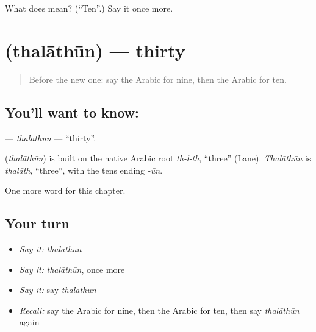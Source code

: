 \begin{tcolorbox}[breakable,colback=teal!4,colframe=teal!35!black,title={Before you move on}]
What does  mean? (\textquotedblleft{}Ten\textquotedblright{}.) Say it once more.
\end{tcolorbox}
\section[\texorpdfstring{\ar{ثلاثون} (thalāthūn)}{ثلاثون (thalāthūn)}]{ (thalāthūn) — thirty}

\label{lesson:AR-C97-thalathun}



\begin{quote}
Before the new one: say the Arabic for nine, then the Arabic for ten.
\end{quote}

\subsection*{You'll want to know: }
\textbf{} — \emph{thalāthūn} — \textquotedblleft{}thirty\textquotedblright{}.

\begin{cousinweb}
\textbf{} (\emph{thalāthūn}) is built on the native Arabic root \emph{th-l-th}, \textquotedblleft{}three\textquotedblright{} (Lane). \emph{Thalāthūn} is \emph{thalāth}, \textquotedblleft{}three\textquotedblright{}, with the tens ending \emph{-ūn}.
\end{cousinweb}

\begin{grammarlens}[title={What you've built}]
One more word for this chapter.
\end{grammarlens}

\subsection*{Your turn}
\begin{itemize}
\raggedright
  \item \emph{Say it:} \emph{thalāthūn}
  \item \emph{Say it:} \emph{thalāthūn}, once more
  \item \emph{Say it:} say \emph{thalāthūn}
  \item \emph{Recall:} say the Arabic for nine, then the Arabic for ten, then say \emph{thalāthūn} again
\end{itemize}

